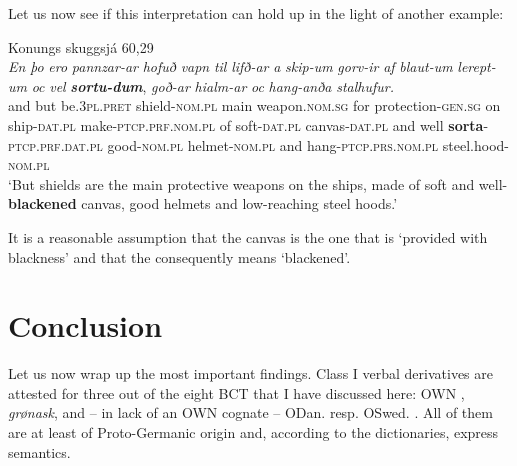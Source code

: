 \documentclass[output=paper,colorlinks,citecolor=brown]{langscibook}
\begin{document}
Let us now see if this interpretation can hold up in the light of another example:
 
\begin{exe} 
    \ex Konungs skuggsjá 60,29 \label{ex:sorta2}\\
     \textit{En} \textit{þo} \textit{ero} \textit{pannzar-ar} \textit{hofuð} \textit{vapn} \textit{til} \textit{lifð-ar} \textit{a} \textit{skip-um} \textit{gorv-ir} \textit{af} \textit{blaut-um} \textit{lerept-um} \textit{oc} \textit{vel} {\textit{\textbf{sortu-dum}}}, \textit{goð-ar} \textit{hialm-ar} \textit{oc} \textit{hang-anða} \textit{stalhufur.}\\
   {} and but be.\textsc{3pl.pret} shield\textsc{-nom.pl} main weapon.\textsc{nom.sg} for protection\textsc{-gen.sg} on ship-\textsc{dat.pl} make-\textsc{ptcp.prf.nom.pl} of soft-\textsc{dat.pl} canvas-\textsc{dat.pl} and well \textbf{sorta}-\textsc{ptcp.prf.dat.pl} good-\textsc{nom.pl} helmet-\textsc{nom.pl} and hang-\textsc{ptcp.prs.nom.pl} {steel.hood-\textsc{nom.pl}}\\
    \glt ‘But shields are the main protective weapons on the ships, made of soft and well-\textbf{blackened} canvas, good helmets and low-reaching steel hoods.’
\end{exe} 

It is a reasonable assumption that the canvas is the one that is ‘provided with blackness’ and that the  consequently means ‘blackened’.

\section{Conclusion}
\label{sec:OWNconclusion}

Let us now wrap up the most important findings. Class I verbal derivatives are attested for three out of the eight BCT  that I have discussed here: OWN ,  \textit{grønask}, and – in lack of an OWN cognate – ODan.  resp. OSwed. . All of them are at least of Proto-Germanic origin and, according to the dictionaries, express  semantics.
\end{document}
